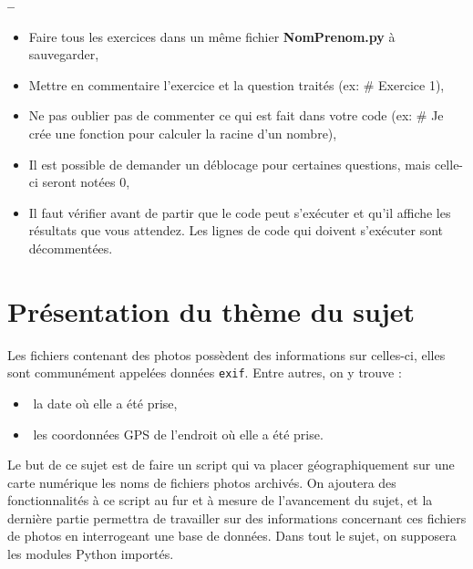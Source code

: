 


\usepackage{enumitem}
\usepackage{pdfpages}







\begin{center}
{\Large\bf {\type} \no {\numero} -- \descrip}
\end{center}


\begin{boxedminipage}{.9\textwidth} 
\begin{itemize}
 \item Faire tous les exercices dans un même fichier \textbf{NomPrenom.py} à sauvegarder,
 \item Mettre en commentaire l'exercice et la question traités (ex: \# Exercice 1),
 \item Ne pas oublier pas de commenter ce qui est fait dans votre code (ex: \# Je crée une fonction pour calculer la racine d'un nombre),
 \item Il est possible de demander un déblocage pour certaines questions, mais celle-ci seront notées 0,
 \item Il faut vérifier avant de partir que le code peut s'exécuter et qu'il affiche les résultats que vous attendez. Les lignes de code qui doivent s'exécuter sont décommentées.
\end{itemize}
\end{boxedminipage}

\section*{Présentation du thème du sujet}

Les fichiers contenant des photos possèdent des informations sur celles-­ci, elles sont communément appelées données \verb?exif?. Entre autres, on y trouve :
\begin{itemize}
\item­ la date où elle a été prise,
\item­ les coordonnées GPS de l’endroit où elle a été prise.
\end{itemize}

Le but de ce sujet est de faire un script qui va placer géographiquement sur une carte numérique les noms de fichiers photos archivés. On ajoutera des fonctionnalités à ce script au fur et à mesure de l’avancement du sujet, et la dernière partie permettra de travailler sur des informations concernant ces fichiers de photos en interrogeant une base de données. Dans tout le sujet, on supposera les modules Python importés.

